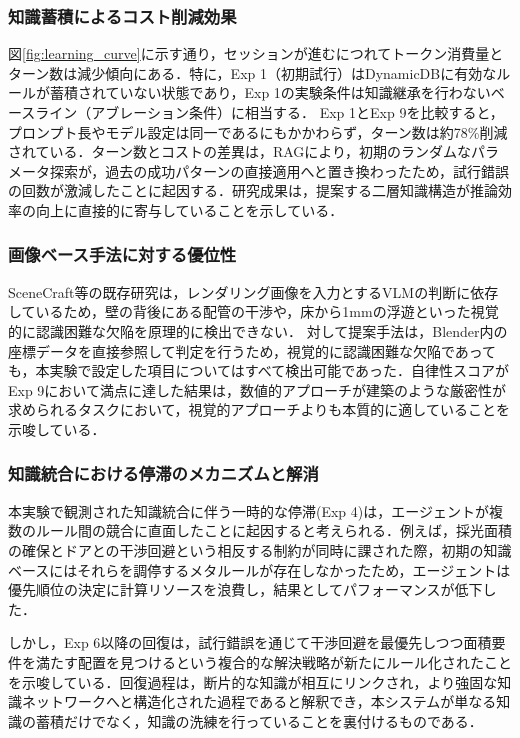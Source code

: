 \documentclass[dvipdfmx, a4paper, 9pt]{deimj}
\begin{document}
\subsubsection{知識蓄積によるコスト削減効果}
図\ref{fig:learning_curve}に示す通り，セッションが進むにつれてトークン消費量とターン数は減少傾向にある．特に，Exp 1（初期試行）はDynamicDBに有効なルールが蓄積されていない状態であり，Exp 1の実験条件は知識継承を行わないベースライン（アブレーション条件）に相当する．
Exp 1とExp 9を比較すると，プロンプト長やモデル設定は同一であるにもかかわらず，ターン数は約78\%削減されている．ターン数とコストの差異は，RAGにより，初期のランダムなパラメータ探索が，過去の成功パターンの直接適用へと置き換わったため，試行錯誤の回数が激減したことに起因する．研究成果は，提案する二層知識構造が推論効率の向上に直接的に寄与していることを示している．

\subsubsection{画像ベース手法に対する優位性}
SceneCraft等の既存研究は，レンダリング画像を入力とするVLMの判断に依存しているため，壁の背後にある配管の干渉や，床から1mmの浮遊といった視覚的に認識困難な欠陥を原理的に検出できない．
対して提案手法は，Blender内の座標データを直接参照して判定を行うため，視覚的に認識困難な欠陥であっても，本実験で設定した項目についてはすべて検出可能であった．自律性スコアがExp 9において満点に達した結果は，数値的アプローチが建築のような厳密性が求められるタスクにおいて，視覚的アプローチよりも本質的に適していることを示唆している．

\subsubsection{知識統合における停滞のメカニズムと解消}
本実験で観測された知識統合に伴う一時的な停滞(Exp 4)は，エージェントが複数のルール間の競合に直面したことに起因すると考えられる．例えば，採光面積の確保とドアとの干渉回避という相反する制約が同時に課された際，初期の知識ベースにはそれらを調停するメタルールが存在しなかったため，エージェントは優先順位の決定に計算リソースを浪費し，結果としてパフォーマンスが低下した．

しかし，Exp 6以降の回復は，試行錯誤を通じて干渉回避を最優先しつつ面積要件を満たす配置を見つけるという複合的な解決戦略が新たにルール化されたことを示唆している．回復過程は，断片的な知識が相互にリンクされ，より強固な知識ネットワークへと構造化された過程であると解釈でき，本システムが単なる知識の蓄積だけでなく，知識の洗練を行っていることを裏付けるものである．
\end{document}
